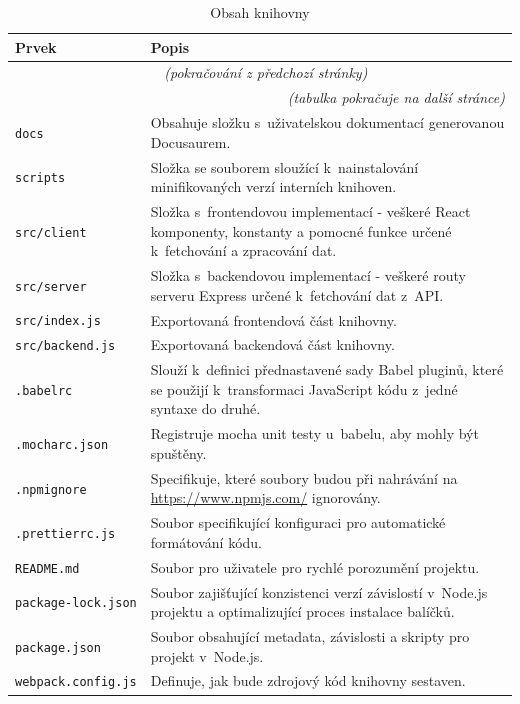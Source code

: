 \documentclass[czech, bc, kiv, he, iso690numb, viewonly]{fasthesis} %
\begin{document}
	\begin{longtable}{p{}p{}}
	\caption{Obsah knihovny}
	\label{tab:dirLibrary}\\
	\toprule[1.5pt]
	\textbf{Prvek} & \textbf{Popis}\\
	\midrule
	\endfirsthead
	\multicolumn{2}{c}{\tablename{}~\thetable{} \textit{(pokračování z předchozí stránky)}}\\
	\endhead
	\midrule
	\multicolumn{2}{r}{\textit{(tabulka pokračuje na další stránce)}}\\
	\endfoot
	\bottomrule[1.5pt]
	\endlastfoot
	\verb"docs" & Obsahuje složku s~uživatelskou dokumentací generovanou Docusaurem. \\
	\midrule
	\verb"scripts" & Složka se souborem sloužící k~nainstalování minifikovaných verzí interních knihoven. \\
	\midrule
	\verb"src/client" & Složka s~frontendovou implementací - veškeré React komponenty, konstanty a pomocné funkce určené k~fetchování a zpracování dat.  \\
	\midrule
	\verb"src/server" & Složka s~backendovou implementací - veškeré routy serveru Express určené k~fetchování dat z~API.  \\
	\midrule
	\verb"src/index.js" & Exportovaná frontendová část knihovny. \\
	\midrule
	\verb"src/backend.js" & Exportovaná backendová část knihovny. \\
	\midrule
	\verb".babelrc" & Slouží k~definici přednastavené sady Babel pluginů, které se použijí k~transformaci JavaScript kódu z~jedné syntaxe do druhé.  \\
	\midrule
	\verb".mocharc.json" & Registruje mocha unit testy u~babelu, aby mohly být spuštěny.  \\
	\midrule
	\verb".npmignore" & Specifikuje, které soubory budou při nahrávání na \url{https://www.npmjs.com/} ignorovány. \\
	\midrule
	\verb".prettierrc.js" & Soubor specifikující konfiguraci pro automatické formátování kódu. \\
	\midrule
	\verb"README.md" & Soubor pro uživatele pro rychlé porozumění projektu.  \\
	\midrule
	\verb"package-lock.json" & Soubor zajišťující konzistenci verzí závislostí v~Node.js projektu a optimalizující proces instalace balíčků.  \\
	\midrule
	\verb"package.json" & Soubor obsahující metadata, závislosti a skripty pro projekt v~Node.js. \\
	\midrule
	\verb"webpack.config.js" & Definuje, jak bude zdrojový kód knihovny sestaven.  \\
	\end{longtable}
\end{document}
